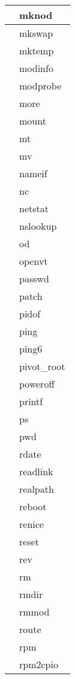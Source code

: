 \begin{longtable}{p{64mm}p{64mm}}
     \hline
      & mknod \\
     \hline
      & mkswap \\
     \hline
      & mktemp \\
     \hline
      & modinfo \\
     \hline
      & modprobe \\
     \hline
      & more \\
     \hline
      & mount \\
     \hline
      & mt \\
     \hline
      & mv \\
     \hline
      & nameif \\
     \hline
      & nc \\
     \hline
      & netstat \\
     \hline
      & nslookup \\
     \hline
      & od \\
     \hline
      & openvt \\
     \hline
      & passwd \\
     \hline
      & patch \\
     \hline
      & pidof \\
     \hline
      & ping \\
     \hline
      & ping6 \\
     \hline
      & pivot\_root \\
     \hline
      & poweroff \\
     \hline
      & printf \\
     \hline
      & ps \\
     \hline
      & pwd \\
     \hline
      & rdate \\
     \hline
      & readlink \\
     \hline
      & realpath \\
     \hline
      & reboot \\
     \hline
      & renice \\
     \hline
      & reset \\
     \hline
      & rev \\
     \hline
      & rm \\
     \hline
      & rmdir \\
     \hline
      & rmmod \\
     \hline
      & route \\
     \hline
      & rpm \\
     \hline
      & rpm2cpio \\

\end{longtable}
